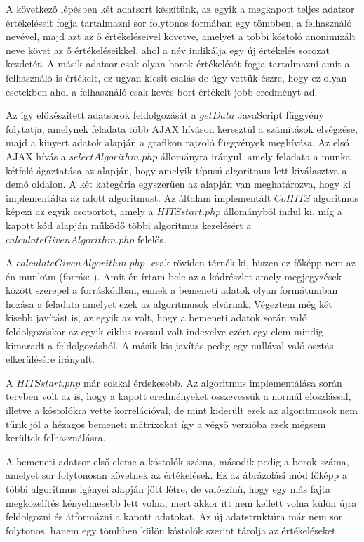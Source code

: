 \documentclass[12pt]{report}
\theoremstyle{definition}
\begin{document}
	A következő lépésben két adatsort készítünk, az egyik a megkapott teljes adatsor értékeléseit fogja tartalmazni sor folytonos formában egy tömbben, a felhasználó nevével, majd azt az ő értékeléseivel követve, amelyet a többi kóstoló anonimizált neve követ az ő értékeléseikkel, ahol a név indikálja egy új értékelés sorozat kezdetét. A másik adatsor csak olyan borok értékelését fogja tartalmazni amit a felhasználó is értékelt, ez ugyan kicsit csalás de úgy vettük észre, hogy ez olyan esetekben ahol a felhasználó csak kevés bort értékelt jobb eredményt ad.
	
	Az így előkészített adatsorok feldolgozását a $getData$ JavaScript függvény folytatja, amelynek feladata több AJAX híváson keresztül a számítások elvégzése, majd a kinyert adatok alapján a grafikon rajzoló függvények meghívása. Az első AJAX hívás a $selectAlgorithm.php$ állományra irányul, amely feladata a munka kétfelé ágaztatása az alapján, hogy amelyik típusú algoritmus lett kiválasztva a demó oldalon. A két kategória egyszerűen az alapján van meghatározva, hogy ki implementálta az adott algoritmust. Az általam implementált $CoHITS$ algoritmus képezi az egyik csoportot, amely a \linebreak$HITSstart.php$ állományból indul ki, míg a kapott kód alapján működő többi algoritmus kezelésért a $calculateGivenAlgorithm.php$ felelős.
	
	A $calculateGivenAlgorithm.php$ -csak röviden térnék ki, hiszen ez főképp nem az én munkám (forrás: \cite{Borkostolas projekt}). Amit én írtam bele az a kódrészlet amely megjegyzések között szerepel a forráskódban, ennek a bemeneti adatok olyan formátumban hozása a feladata amelyet ezek az algoritmusok elvárnak. Végeztem még két kisebb javítást is, az egyik az volt, hogy a bemeneti adatok során való feldolgozáskor az egyik ciklus rosszul volt indexelve ezért egy elem mindig kimaradt a feldolgozásból. A másik kis javítás pedig egy nullával való osztás elkerülésére irányult.
	
	A $HITSstart.php$ már sokkal érdekesebb. Az algoritmus implementálása során tervben volt az is, hogy a kapott eredményeket összevessük a normál eloszlással, illetve a kóstolókra vette korrelációval, de mint kiderült ezek az algoritmusok nem tűrik jól a hézagos bemeneti mátrixokat így a végső verzióba ezek mégsem kerültek felhasználásra.
	
	A bemeneti adatsor első eleme a kóstolók száma, második pedig a borok száma, amelyet sor folytonosan követnek az értékelések. Ez az ábrázolási mód főképp a többi algoritmus igényei alapján jött létre, de valószínű, hogy egy más fajta megközelítés kényelmesebb lett volna, mert akkor itt nem kellett volna külön újra feldolgozni és átformázni a kapott adatokat. Az új adatstruktúra már nem sor folytonos, hanem egy tömbben külön kóstolók szerint tárolja az értékeléseket.
	
\end{document}
